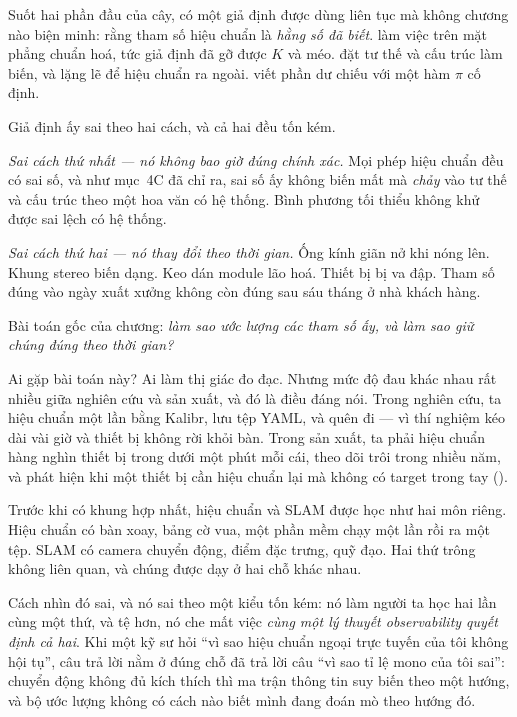 \documentclass[../../vslam.tex]{subfiles}
\begin{document}
Suốt hai phần đầu của cây, có một giả định được dùng liên tục mà không chương nào biện minh: rằng tham số hiệu chuẩn là \emph{hằng số đã biết}.  làm việc trên mặt phẳng chuẩn hoá, tức giả định đã gỡ được \(K\) và méo.  đặt tư thế và cấu trúc làm biến, và lặng lẽ để hiệu chuẩn ra ngoài.  viết phần dư chiếu với một hàm \(\pi\) cố định.

Giả định ấy sai theo hai cách, và cả hai đều tốn kém.

\emph{Sai cách thứ nhất --- nó không bao giờ đúng chính xác.} Mọi phép hiệu chuẩn đều có sai số, và như  mục~4C đã chỉ ra, sai số ấy không biến mất mà \emph{chảy} vào tư thế và cấu trúc theo một hoa văn có hệ thống. Bình phương tối thiểu không khử được sai lệch có hệ thống.

\emph{Sai cách thứ hai --- nó thay đổi theo thời gian.} Ống kính giãn nở khi nóng lên. Khung stereo biến dạng. Keo dán module lão hoá. Thiết bị bị va đập. Tham số đúng vào ngày xuất xưởng không còn đúng sau sáu tháng ở nhà khách hàng.

Bài toán gốc của chương: \emph{làm sao ước lượng các tham số ấy, và làm sao giữ chúng đúng theo thời gian?}

Ai gặp bài toán này? Ai làm thị giác đo đạc. Nhưng mức độ đau khác nhau rất nhiều giữa nghiên cứu và sản xuất, và đó là điều đáng nói. Trong nghiên cứu, ta hiệu chuẩn một lần bằng Kalibr, lưu tệp YAML, và quên đi --- vì thí nghiệm kéo dài vài giờ và thiết bị không rời khỏi bàn. Trong sản xuất, ta phải hiệu chuẩn hàng nghìn thiết bị trong dưới một phút mỗi cái, theo dõi trôi trong nhiều năm, và phát hiện khi một thiết bị cần hiệu chuẩn lại mà không có target trong tay ().

Trước khi có khung hợp nhất, hiệu chuẩn và SLAM được học như hai môn riêng. Hiệu chuẩn có bàn xoay, bảng cờ vua, một phần mềm chạy một lần rồi ra một tệp. SLAM có camera chuyển động, điểm đặc trưng, quỹ đạo. Hai thứ trông không liên quan, và chúng được dạy ở hai chỗ khác nhau.

Cách nhìn đó sai, và nó sai theo một kiểu tốn kém: nó làm người ta học hai lần cùng một thứ, và tệ hơn, nó che mất việc \emph{cùng một lý thuyết observability quyết định cả hai}. Khi một kỹ sư hỏi ``vì sao hiệu chuẩn ngoại trực tuyến của tôi không hội tụ'', câu trả lời nằm ở đúng chỗ đã trả lời câu ``vì sao tỉ lệ mono của tôi sai'': chuyển động không đủ kích thích thì ma trận thông tin suy biến theo một hướng, và bộ ước lượng không có cách nào biết mình đang đoán mò theo hướng đó.
\end{document}
